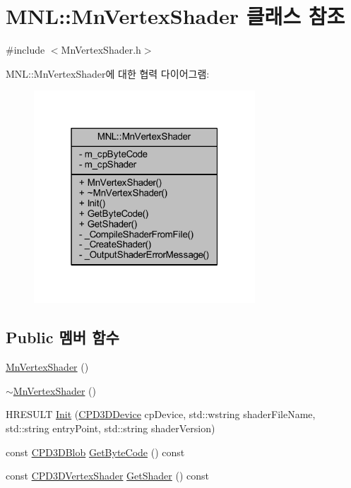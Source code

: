 \hypertarget{class_m_n_l_1_1_mn_vertex_shader}{}\section{M\+NL\+:\+:Mn\+Vertex\+Shader 클래스 참조}
\label{class_m_n_l_1_1_mn_vertex_shader}


{\ttfamily \#include $<$Mn\+Vertex\+Shader.\+h$>$}



M\+NL\+:\+:Mn\+Vertex\+Shader에 대한 협력 다이어그램\+:\nopagebreak
\begin{figure}[H]
\begin{center}
\leavevmode
\includegraphics[width=235pt]{class_m_n_l_1_1_mn_vertex_shader__coll__graph}
\end{center}
\end{figure}
\subsection*{Public 멤버 함수}
\begin{DoxyCompactItemize}
\item 
\hyperlink{class_m_n_l_1_1_mn_vertex_shader_a21690c1ec2d42845c4b9f1e3fa72e053}{Mn\+Vertex\+Shader} ()
\item 
\hyperlink{class_m_n_l_1_1_mn_vertex_shader_a4077f03af7d311e898b391a27e0c6e0c}{$\sim$\+Mn\+Vertex\+Shader} ()
\item 
H\+R\+E\+S\+U\+LT \hyperlink{class_m_n_l_1_1_mn_vertex_shader_a571c6c25624a5a80eed0b918e15fedea}{Init} (\hyperlink{namespace_m_n_l_a1eec210db8f309a4a9ac0d9658784c31}{C\+P\+D3\+D\+Device} cp\+Device, std\+::wstring shader\+File\+Name, std\+::string entry\+Point, std\+::string shader\+Version)
\item 
const \hyperlink{namespace_m_n_l_a3716e3bee60c31fe1b7b5dd5a82db59a}{C\+P\+D3\+D\+Blob} \hyperlink{class_m_n_l_1_1_mn_vertex_shader_a8fafc09c812a8209bc4726fb4fc56de8}{Get\+Byte\+Code} () const
\item 
const \hyperlink{namespace_m_n_l_a8036d713226061c4827b537821fbf79b}{C\+P\+D3\+D\+Vertex\+Shader} \hyperlink{class_m_n_l_1_1_mn_vertex_shader_a2c2d71e7d34b9d996ff21896bf266e90}{Get\+Shader} () const
\end{DoxyCompactItemize}

